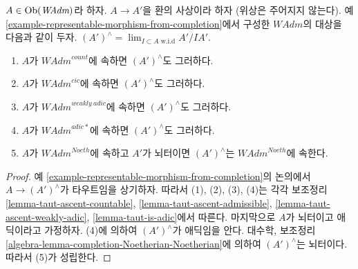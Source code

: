 \begin{lemma}
\label{lemma-completion-in-sub}
$A \in \mathop{\mathrm{Ob}}\nolimits(\textit{WAdm})$라 하자. $A \to A'$을 환의 사상이라 하자
(위상은 주어지지 않는다). 예
\ref{example-representable-morphism-from-completion}에서 구성한
$\textit{WAdm}$의 대상을 다음과 같이 두자.
$(A')^\wedge = \lim_{I \subset A\text{ w.i.d}} A'/IA'$.
\begin{enumerate}
\item $A$가 $\textit{WAdm}^{count}$에 속하면 $(A')^\wedge$도
그러하다.
\item $A$가 $\textit{WAdm}^{cic}$에 속하면 $(A')^\wedge$도
그러하다.
\item $A$가 $\textit{WAdm}^{weakly\ adic}$에 속하면
$(A')^\wedge$도 그러하다.
\item $A$가 $\textit{WAdm}^{adic*}$에 속하면 $(A')^\wedge$도
그러하다.
\item $A$가 $\textit{WAdm}^{Noeth}$에 속하고 $A'$가 뇌터이면
$(A')^\wedge$는 $\textit{WAdm}^{Noeth}$에 속한다.
\end{enumerate}
\end{lemma}

\begin{proof}
예 \ref{example-representable-morphism-from-completion}의 논의에서
$A \to (A')^\wedge$가 타우트임을 상기하자. 따라서 (1), (2), (3),
(4)는 각각 보조정리
\ref{lemma-taut-ascent-countable},
\ref{lemma-taut-ascent-admissible},
\ref{lemma-taut-ascent-weakly-adic},
\ref{lemma-taut-is-adic}에서 따른다. 마지막으로 $A$가 뇌터이고
애딕이라고 가정하자. (4)에 의하여 $(A')^\wedge$가 애딕임을 안다.
대수학, 보조정리
\ref{algebra-lemma-completion-Noetherian-Noetherian}에 의하여
$(A')^\wedge$는 뇌터이다. 따라서 (5)가 성립한다.
\end{proof}

